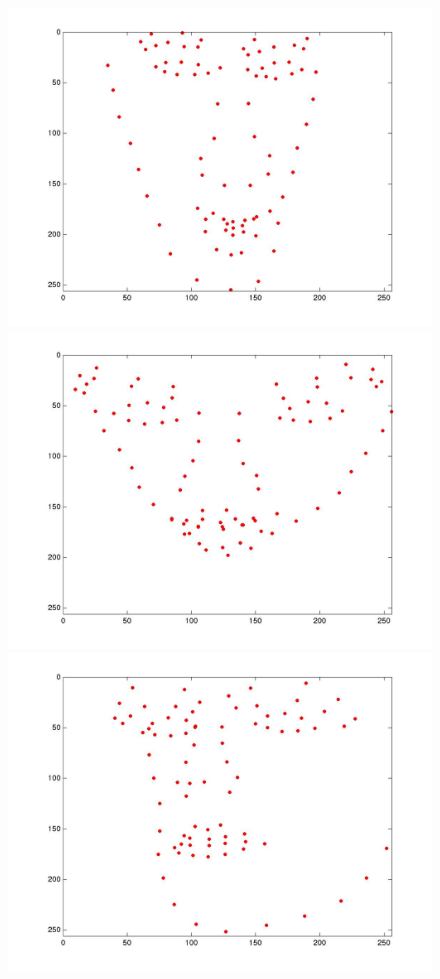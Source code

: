 \documentclass[12pt]{ctexart}
\begin{document}
\begin{enumerate}
\begin{figure}[H]
  \centering
  \includegraphics[scale=0.15]{b_eigenlm1.jpg} 
  \includegraphics[scale=0.15]{b_eigenlm2.jpg} 
  \includegraphics[scale=0.15]{b_eigenlm3.jpg} 

\end{figure}
\end{enumerate}
\end{document}
